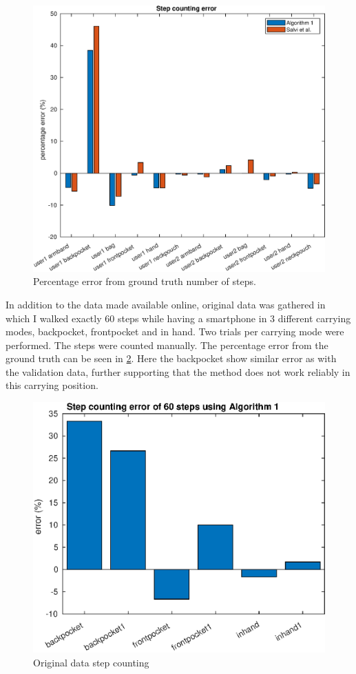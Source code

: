 	\begin{figure}[H]
		\centering
		\includegraphics[width=0.7\linewidth]{images/20201112_1401_Step_counting_error}
		\caption{Percentage error from ground truth number of steps. }
		\setlength{\belowcaptionskip}{-2cm}
		\label{fig:sd_percent_comparison}
	\end{figure}
In addition to the data made available online, original data was gathered in which I walked exactly 60 steps while having a smartphone in 3 different carrying modes, backpocket, frontpocket and in hand. Two trials per carrying mode were performed. The steps were counted manually. The percentage error from the ground truth can be seen in \cref{fig:202009291013step_counting_error_of_60_steps}. Here the backpocket show similar error as with the validation data, further supporting that the method does not work reliably in this carrying position.
\begin{figure}[H]
	\centering
	\includegraphics[width=0.55\linewidth]{images/20201112_1406_Step_counting_error_of_60_steps_using_Algorithm_1}
	\setlength{\belowcaptionskip}{-20pt}
	\caption{Original data step counting}
	\label{fig:202009291013step_counting_error_of_60_steps}
\end{figure}

